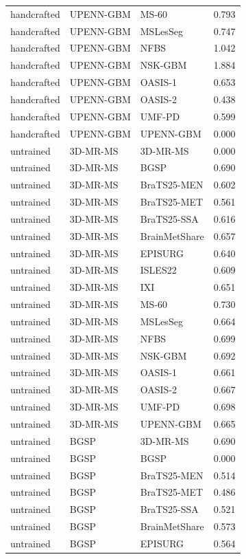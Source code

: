 \begin{tabular}{lllr}
handcrafted & UPENN-GBM & MS-60 & 0.793 \\
handcrafted & UPENN-GBM & MSLesSeg & 0.747 \\
handcrafted & UPENN-GBM & NFBS & 1.042 \\
handcrafted & UPENN-GBM & NSK-GBM & 1.884 \\
handcrafted & UPENN-GBM & OASIS-1 & 0.653 \\
handcrafted & UPENN-GBM & OASIS-2 & 0.438 \\
handcrafted & UPENN-GBM & UMF-PD & 0.599 \\
handcrafted & UPENN-GBM & UPENN-GBM & 0.000 \\
untrained & 3D-MR-MS & 3D-MR-MS & 0.000 \\
untrained & 3D-MR-MS & BGSP & 0.690 \\
untrained & 3D-MR-MS & BraTS25-MEN & 0.602 \\
untrained & 3D-MR-MS & BraTS25-MET & 0.561 \\
untrained & 3D-MR-MS & BraTS25-SSA & 0.616 \\
untrained & 3D-MR-MS & BrainMetShare & 0.657 \\
untrained & 3D-MR-MS & EPISURG & 0.640 \\
untrained & 3D-MR-MS & ISLES22 & 0.609 \\
untrained & 3D-MR-MS & IXI & 0.651 \\
untrained & 3D-MR-MS & MS-60 & 0.730 \\
untrained & 3D-MR-MS & MSLesSeg & 0.664 \\
untrained & 3D-MR-MS & NFBS & 0.699 \\
untrained & 3D-MR-MS & NSK-GBM & 0.692 \\
untrained & 3D-MR-MS & OASIS-1 & 0.661 \\
untrained & 3D-MR-MS & OASIS-2 & 0.667 \\
untrained & 3D-MR-MS & UMF-PD & 0.698 \\
untrained & 3D-MR-MS & UPENN-GBM & 0.665 \\
untrained & BGSP & 3D-MR-MS & 0.690 \\
untrained & BGSP & BGSP & 0.000 \\
untrained & BGSP & BraTS25-MEN & 0.514 \\
untrained & BGSP & BraTS25-MET & 0.486 \\
untrained & BGSP & BraTS25-SSA & 0.521 \\
untrained & BGSP & BrainMetShare & 0.573 \\
untrained & BGSP & EPISURG & 0.564 \\

\end{tabular}
